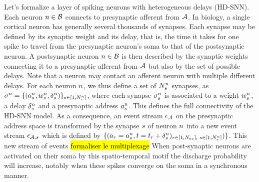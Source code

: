 \documentclass[default]{sn-jnl}%
\theoremstyle{thmstyleone}%
\theoremstyle{thmstyletwo}%
\theoremstyle{thmstylethree}%
\newcommand{\note}[1]{{\sethlcolor{yellow}\hl{#1}}}
\begin{document}

Let's formalize a layer of spiking neurons with heterogeneous delays (HD-SNN). Each neuron $n \in \mathcal{B}$  connects to presynaptic afferent from $\mathcal{A}$. In biology, a single cortical neuron has generally several thousands of synapses. Each synapse may be defined by its synaptic weight and its delay, that is, the time it takes for one spike to travel from the presynaptic neuron's soma to that of the postsynaptic neuron. A postsynaptic neuron $n \in \mathcal{B}$ is then described by the synaptic weights connecting it to a presynaptic afferent from $\mathcal{A}$ but also by the set of possible delays. Note that a neuron may contact an afferent neuron with multiple different delays. For each neuron $n$, we thus define a set of $N_{s}^n$ synapses, as  $\sigma^n = \{(a^n_s, w^n_s, \delta^n_s)\}_{s \in [1,N_{s}^n]}$, where each synapse $\sigma^n_s$ is associated to a weight $w^n_s$, a delay $\delta^n_s$ and a presynaptic address $a^n_s$. This defines the full connectivity of the HD-SNN model. As a consequence, an event stream $\epsilon_{\mathcal{A}}$ on the presynaptic address space is transformed by the synapse $s$ of neuron $n$ into a new event stream $\epsilon_{\mathcal{A}, s}$ which is defined by 
$\{ (a_r = 
 a_s^n, t=t_r + 
\delta_s^n )_{ r \in [1,N_{ev}]\text{, }s \in [1,N_{s}^n]} )
\}$. This new stream of events \note{formaliser le multiplexage}
When post-synaptic neurons are activated on their soma by this spatio-temporal motif the discharge probability will increase, notably when these spikes converge on the soma in a synchronous manner. 
\end{document}
